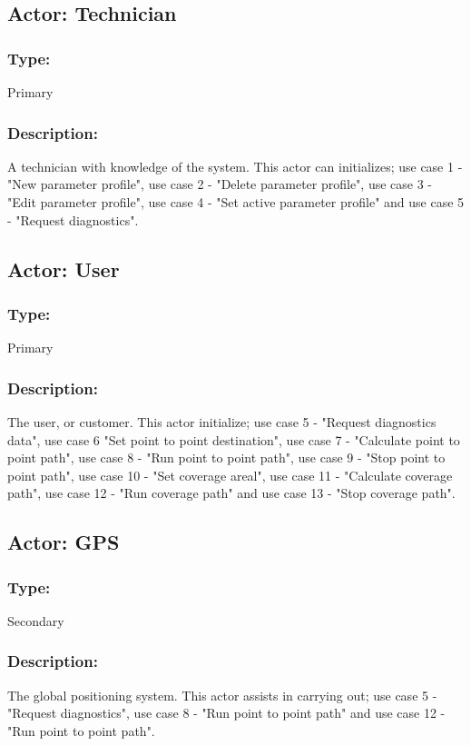 \subsection{Actor: Technician}
\subsubsection*{Type:}
Primary

\subsubsection*{Description:}
A technician with knowledge of the system. This actor can initializes; use case 1 - "New parameter profile", use case 2 - "Delete parameter profile", use case 3 - "Edit parameter profile", use case 4 - "Set active parameter profile" and use case 5 - "Request diagnostics".


\subsection{Actor: User}
\subsubsection*{Type:}
Primary

\subsubsection*{Description:}
The user, or customer. This actor initialize; use case 5 - "Request diagnostics data", use case 6 "Set point to point destination", use case 7 - "Calculate point to point path", use case 8 - "Run point to point path", use case 9 - "Stop point to point path", use case 10 - "Set coverage areal", use case 11 - "Calculate coverage path", use case 12 - "Run coverage path" and use case 13 - "Stop coverage path".


\subsection{Actor: GPS}
\subsubsection*{Type:}
Secondary

\subsubsection*{Description:}
The global positioning system. This actor assists in carrying out; use case 5 - "Request diagnostics", use case 8 - "Run point to point path" and use case 12 - "Run point to point path".


